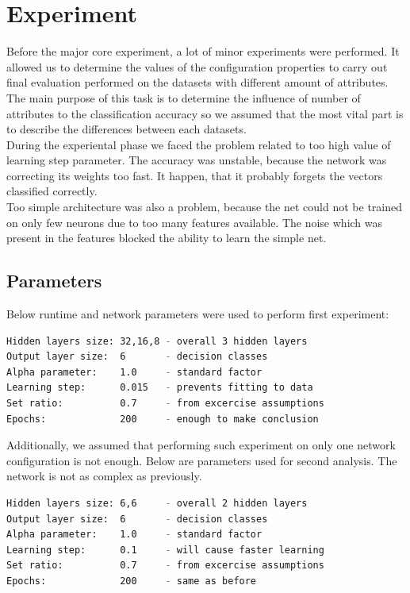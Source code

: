 \documentclass[12pt,a4paper]{article}
\begin{document}
\section{Experiment}
Before the major core experiment, a lot of minor experiments were performed. It allowed us to determine the values of the configuration properties to carry out final evaluation performed on the datasets with different amount of attributes.\\
The main purpose of this task is to determine the influence of number of attributes to the classification accuracy so we assumed that the most vital part is to describe the differences between each datasets.\\
During the experiental phase we faced the problem related to too high value of learning step parameter. The accuracy was unstable, because the network was correcting its weights too fast. It happen, that it probably forgets the vectors classified correctly.\\
Too simple architecture was also a problem, because the net could not be trained on only few neurons due to too many features available. The noise which was present in the features blocked the ability to learn the simple net.
\subsection{Parameters}
Below runtime and network parameters were used to perform first experiment:\\
\begin{lstlisting}[language=bash]
Hidden layers size: 32,16,8 - overall 3 hidden layers
Output layer size:  6       - decision classes 
Alpha parameter:    1.0     - standard factor
Learning step:      0.015   - prevents fitting to data
Set ratio:          0.7     - from excercise assumptions
Epochs:             200     - enough to make conclusion
\end{lstlisting}

Additionally, we assumed that performing such experiment on only one network configuration is not enough. Below are parameters used for second analysis. The network is not as complex as previously.

\begin{lstlisting}[language=bash]
Hidden layers size: 6,6     - overall 2 hidden layers
Output layer size:  6       - decision classes 
Alpha parameter:    1.0     - standard factor
Learning step:      0.1     - will cause faster learning
Set ratio:          0.7     - from excercise assumptions
Epochs:             200     - same as before
\end{lstlisting}
\end{document}
